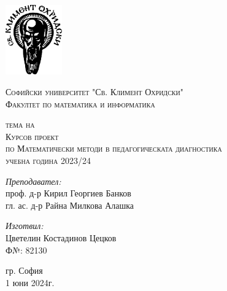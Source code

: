 \newcommand{\univname}{Софийски университет "Св. Климент Охридски"\\Факултет по математика и информатика}

\begin{titlepage}
    \begin{center}
    \vspace*{-2.3cm}
    \includegraphics[height=3cm]{resources/su_logo.png}
        
    \vspace*{.06\textheight}
    {\scshape\large \univname\par}\vspace{2.5cm}
    
    {\huge \bfseries{\thetitle}\par}\vspace{0.7cm}
    \textsc{\small тема на}\\[0.6cm]
    \textsc{\Large Курсов проект}\\[0.5cm]\vspace{0.5cm}
    \textsc{\large по Математически методи в педагогическата диагностика}\\[0.5cm]\vspace{0.5cm}
    \textsc{\normalsize учебна година 2023/24}\\[0.6cm]\vspace{1.2cm}
    
        
    \begin{minipage}[t]{0.4\textwidth}
        \begin{flushleft} \large
        \emph{Преподавател:}\\[0.7cm]
        проф. д-р Кирил Георгиев Банков\\
        гл. ас. д-р Райна Милкова Алашка\\[1.6cm]
        
        \end{flushleft}
    \end{minipage}
    \begin{minipage}[t]{0.4\textwidth}
        \begin{flushright} \large
        \emph{Изготвил:}\\[0.7cm]
        Цветелин Костадинов Цецков\\[0.5cm]
        Ф№: 82130\\[0.5cm]
        \end{flushright}
    \end{minipage}

    \vspace{1cm}
    {\large 
    гр. София\\[0.5cm]
    1 юни 2024г.
    }
    
    \end{center}
\end{titlepage}